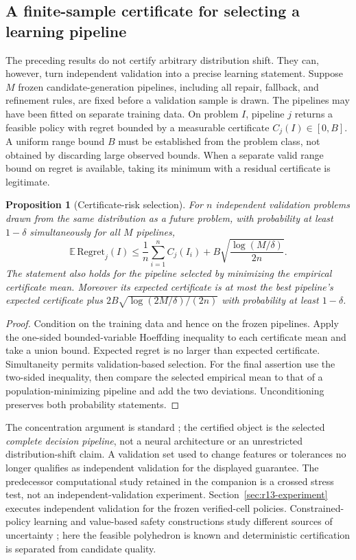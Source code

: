 \documentclass[11pt,letterpaper]{article}
\newtheorem{proposition}[theorem]{Proposition}
\theoremstyle{definition}
\newcommand{\1}{\mathbf 1}
\begin{document}
\subsection{A finite-sample certificate for selecting a learning pipeline}
The preceding results do not certify arbitrary distribution shift. They can, however, turn independent validation into a precise learning statement. Suppose $M$ frozen candidate-generation pipelines, including all repair, fallback, and refinement rules, are fixed before a validation sample is drawn. The pipelines may have been fitted on separate training data. On problem $I$, pipeline $j$ returns a feasible policy with regret bounded by a measurable certificate $C_j(I)\in[0,B]$. A uniform range bound $B$ must be established from the problem class, not obtained by discarding large observed bounds. When a separate valid range bound on regret is available, taking its minimum with a residual certificate is legitimate.

\begin{proposition}[Certificate-risk selection]\label{prop:r12-risk}
For $n$ independent validation problems drawn from the same distribution as a future problem, with probability at least $1-\delta$ simultaneously for all $M$ pipelines,
\begin{equation}\label{eq:r12-risk}
 \mathbb E\,\mathrm{Regret}_j(I)
 \leq\frac1n\sum_{i=1}^n C_j(I_i)
             +B\sqrt{\frac{\log(M/\delta)}{2n}}.
\end{equation}
The statement also holds for the pipeline selected by minimizing the empirical certificate mean. Moreover its expected certificate is at most the best pipeline's expected certificate plus
$2B\sqrt{\log(2M/\delta)/(2n)}$ with probability at least $1-\delta$.
\end{proposition}
\begin{proof}
Condition on the training data and hence on the frozen pipelines. Apply the one-sided bounded-variable Hoeffding inequality to each certificate mean and take a union bound. Expected regret is no larger than expected certificate. Simultaneity permits validation-based selection. For the final assertion use the two-sided inequality, then compare the selected empirical mean to that of a population-minimizing pipeline and add the two deviations. Unconditioning preserves both probability statements.
\end{proof}
The concentration argument is standard \citep{Hoeffding1963}; the certified object is the selected \emph{complete decision pipeline}, not a neural architecture or an unrestricted distribution-shift claim. A validation set used to change features or tolerances no longer qualifies as independent validation for the displayed guarantee. The predecessor computational study retained in the companion is a crossed stress test, not an independent-validation experiment. Section~\ref{sec:r13-experiment} executes independent validation for the frozen verified-cell policies. Constrained-policy learning and value-based safety constructions study different sources of uncertainty \citep{Satija2020,WachiSui2020}; here the feasible polyhedron is known and deterministic certification is separated from candidate quality.
\end{document}
